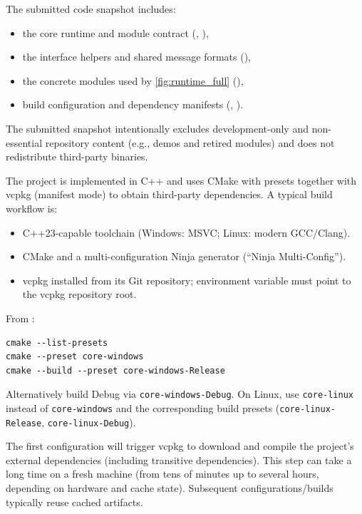 The submitted code snapshot includes:
\begin{itemize}
    \item the core runtime and module contract (, ),
    \item the interface helpers and shared message formats (),
    \item the concrete modules used by \autoref{fig:runtime_full} (),
    \item build configuration and dependency manifests (, ).
\end{itemize}

The submitted snapshot intentionally excludes development-only and non-essential repository content (e.g., demos and retired modules) and does not redistribute third-party binaries.

The project is implemented in C++ and uses CMake with presets together with vcpkg (manifest mode) to obtain third-party dependencies.
A typical build workflow is:

\begin{itemize}
    \item C++23-capable toolchain (Windows: MSVC; Linux: modern GCC/Clang).
    \item CMake and a multi-configuration Ninja generator (``Ninja Multi-Config'').
    \item vcpkg installed from its Git repository; environment variable  must point to the vcpkg repository root.
\end{itemize}

From :

\begin{verbatim}
cmake --list-presets
cmake --preset core-windows
cmake --build --preset core-windows-Release
\end{verbatim}

Alternatively build Debug via \texttt{core-windows-Debug}. On Linux, use \texttt{core-linux} instead of \texttt{core-windows} and the corresponding build presets
(\texttt{core-linux-Release}, \texttt{core-linux-Debug}).

The first configuration will trigger vcpkg to download and compile the project’s external dependencies (including transitive dependencies).
This step can take a long time on a fresh machine (from tens of minutes up to several hours, depending on hardware and cache state).
Subsequent configurations/builds typically reuse cached artifacts.

